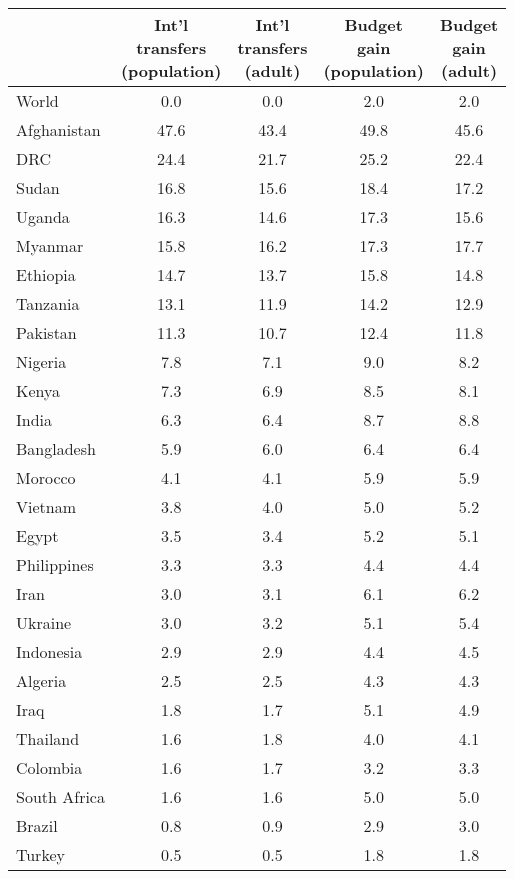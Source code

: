 
\begin{tabular}[t]{lcccc}
\toprule
  & \makecell{Int'l\\transfers\\(population)} & \makecell{Int'l\\transfers\\(adult)} & \makecell{Budget\\gain\\(population)} & \makecell{Budget\\gain\\(adult)}\\
\midrule
World & 0.0 & 0.0 & 2.0 & 2.0\\
Afghanistan & 47.6 & 43.4 & 49.8 & 45.6\\
DRC & 24.4 & 21.7 & 25.2 & 22.4\\
Sudan & 16.8 & 15.6 & 18.4 & 17.2\\
Uganda & 16.3 & 14.6 & 17.3 & 15.6\\
Myanmar & 15.8 & 16.2 & 17.3 & 17.7\\
Ethiopia & 14.7 & 13.7 & 15.8 & 14.8\\
Tanzania & 13.1 & 11.9 & 14.2 & 12.9\\
Pakistan & 11.3 & 10.7 & 12.4 & 11.8\\
Nigeria & 7.8 & 7.1 & 9.0 & 8.2\\
Kenya & 7.3 & 6.9 & 8.5 & 8.1\\
India & 6.3 & 6.4 & 8.7 & 8.8\\
Bangladesh & 5.9 & 6.0 & 6.4 & 6.4\\
Morocco & 4.1 & 4.1 & 5.9 & 5.9\\
Vietnam & 3.8 & 4.0 & 5.0 & 5.2\\
Egypt & 3.5 & 3.4 & 5.2 & 5.1\\
Philippines & 3.3 & 3.3 & 4.4 & 4.4\\
Iran & 3.0 & 3.1 & 6.1 & 6.2\\
Ukraine & 3.0 & 3.2 & 5.1 & 5.4\\
Indonesia & 2.9 & 2.9 & 4.4 & 4.5\\
Algeria & 2.5 & 2.5 & 4.3 & 4.3\\
Iraq & 1.8 & 1.7 & 5.1 & 4.9\\
Thailand & 1.6 & 1.8 & 4.0 & 4.1\\
Colombia & 1.6 & 1.7 & 3.2 & 3.3\\
South Africa & 1.6 & 1.6 & 5.0 & 5.0\\
Brazil & 0.8 & 0.9 & 2.9 & 3.0\\
Turkey & 0.5 & 0.5 & 1.8 & 1.8\\

\end{tabular}
